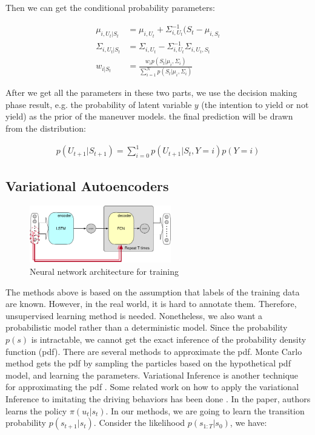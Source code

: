 \documentclass[conference]{IEEEtran}
\begin{document}
Then we can get the conditional probability parameters:

\begin{align}
\mu_{i, U_{t} | S_{t}} &= \mu_{i, U_{t}} + \Sigma_{i, U_{t}}^{-1}(S_{t} - \mu_{i, S_{t}}\\
\Sigma_{i, U_{t} | S_{t}} &= \Sigma_{i, U_{t}} - \Sigma_{i, U_{t}}^{-1}\Sigma_{i, U_{t}, S_{t}}\\
w_{i | S_{t}} &= \frac{w_{i}p(S_{t} | \mu_i, \Sigma_i)}{\sum_{i=1}^{N}{p(S_{t} | \mu_i, \Sigma_i)}}
\end{align}

After we get all the parameters in these two parts, we use the decision making phase result, e.g. the probability of latent variable $y$ (the intention to yield or not yield) as the prior of the maneuver models. the final prediction will be drawn from the distribution:

\begin{align}
p(U_{t+1} | S_{t+1}) = \sum_{i = 0}^{1} p(U_{t+1} | S_{t}, Y = i )p(Y = i)
\end{align}

\subsection{Variational Autoencoders}

\begin{figure}[t]
	\centering
	\includegraphics[width = 0.55\textwidth]{vae.png}
	\caption{Neural network architecture for training}
	\label{fig:nn}
\end{figure}

The methods above is based on the assumption that labels of the training data are known. However, in the real world, it is hard to annotate them. Therefore, unsupervised learning method is needed. Nonetheless, we also want a probabilistic model rather than a deterministic model. Since the probability $p(s)$ is intractable, we cannot get the exact inference of the probability density function (pdf). There are several methods to approximate the pdf. Monte Carlo method gets the pdf by sampling the particles based on the hypothetical pdf model, and learning the parameters. Variational Inference is another technique for approximating the pdf \cite{ref:13,ref:14,ref:15}. Some related work on how to apply the variational Inference to imitating the driving behaviors has been done \cite{ref:8}. In the paper, authors learns the policy $\pi(u_{t} | s_{t})$. In our methods, we are going to learn the transition probability $p(s_{t+1} | s_{t})$. Consider the likelihood $p(s_{1:T}| s_{0})$, we have:
\end{document}
